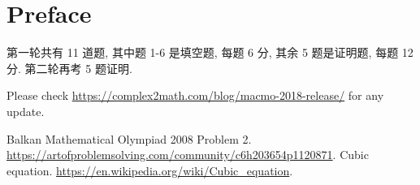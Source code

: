 \documentclass[10pt]{article}
\begin{document}


{}
\section*{Preface}

第一轮共有 11 道题, 其中题 1-6 是填空题, 每题 6 分,
其余 5 题是证明题, 每题 12 分. 第二轮再考 5 题证明.

\bigskip

Please check \url{https://complex2math.com/blog/macmo-2018-release/} for any update.

\newpage

































\newpage

{}
\begin{thebibliography}{99}
Balkan Mathematical Olympiad 2008 Problem 2.\\
\url{https://artofproblemsolving.com/community/c6h203654p1120871}.
Cubic equation.
\url{https://en.wikipedia.org/wiki/Cubic_equation}.
\end{thebibliography}
\end{document}
